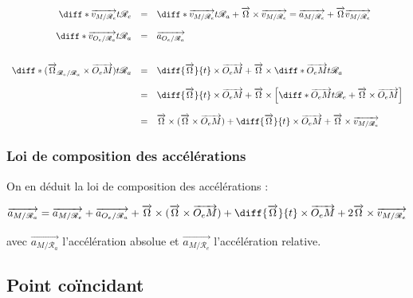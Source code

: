 \documentclass[a4paper,10pt]{book} %
\begin{document}
$$\begin{array}{rcl}
\diff*{\overrightarrow{v_{M/\mathcal{R}_e}}}{t}{\mathcal{R}_e}&=&\diff*{\overrightarrow{v_{M/\mathcal{R}_e}}}{t}{\mathcal{R}_a}+\overrightarrow{\Omega}\times \overrightarrow{v_{M/\mathcal{R}_e}}= \overrightarrow{a_{M/\mathcal{R}_e}}+ \overrightarrow{\Omega}\overrightarrow{v_{M/\mathcal{R}_e}}\\\\
\diff*{\overrightarrow{v_{O_e/\mathcal{R}_a}}}{t}{\mathcal{R}_a}&=&\overrightarrow{a_{O_e/\mathcal{R}_a}}\\\\\\
\diff*{(\overrightarrow{\Omega}_{\mathcal{R}_e/\mathcal{R}_a}\times \overrightarrow{O_eM})}{t}{\mathcal{R}_a}&=&
\diff{\overrightarrow{\Omega}}{t}\times\overrightarrow{O_eM}+\overrightarrow{\Omega}\times \diff*{\overrightarrow{O_eM}}{t}{\mathcal{R}_a}\\\\
&=&\diff{\overrightarrow{\Omega}}{t}\times\overrightarrow{O_eM}+\overrightarrow{\Omega}\times \left[\diff*{\overrightarrow{O_eM}}{t}{\mathcal{R}_e}+\overrightarrow{\Omega}\times \overrightarrow{O_eM}\right]\\\\
&=&\overrightarrow{\Omega}\times (\overrightarrow{\Omega}\times \overrightarrow{O_eM})+\diff{\overrightarrow{\Omega}}{t}\times \overrightarrow{O_eM}+\overrightarrow{\Omega}\times \overrightarrow{v_{M/\mathcal{R}_e}}\end{array}$$

\subsubsection{Loi de composition des accélérations}
On en déduit la loi de composition des accélérations :

$$\overrightarrow{a_{M/\mathcal{R}_a}}=\overrightarrow{a_{M/\mathcal{R}_e}}+\overrightarrow{a_{O_e/\mathcal{R}_a}}+\overrightarrow{\Omega}\times (\overrightarrow{\Omega}\times \overrightarrow{O_eM})+\diff{\overrightarrow{\Omega}}{t}\times \overrightarrow{O_eM}+2\overrightarrow{\Omega}\times \overrightarrow{v_{M/\mathcal{R}_e}}$$

avec $\overrightarrow{a_{M/\mathcal{R}_a}}$ l'accélération absolue et $\overrightarrow{a_{M/\mathcal{R}_e}}$ l'accélération relative.

\newpage

\subsection{Point coïncidant}
\end{document}
